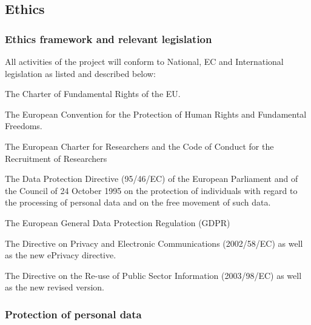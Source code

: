\subsection{Ethics}

\subsubsection{Ethics framework and relevant legislation}

All activities of the \TheProject project will conform to National, EC and International legislation as listed and described below:
\begin{compactitem}
\item The Charter of Fundamental Rights of the EU.
\item The European Convention for the Protection of Human Rights and Fundamental Freedoms.
\item The European Charter for Researchers and the Code of Conduct for the Recruitment of Researchers
\item The Data Protection Directive (95/46/EC) of the European Parliament and of the Council of 24 October 1995 on the protection of individuals with regard to the processing of personal data and on the free movement of such data.
\item The European General Data Protection Regulation (GDPR)
\item The Directive on Privacy and Electronic Communications (2002/58/EC) as well as the new ePrivacy directive.
\item The Directive on the Re-use of Public Sector Information (2003/98/EC) as well as the new revised version.
\end{compactitem}

\subsubsection{Protection of personal data}

